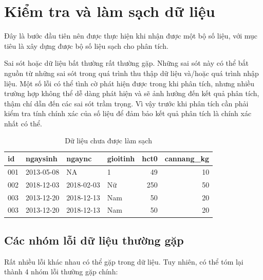 \documentclass[]{tufte-book}
\begin{document}
\hypertarget{data_cleaning}{%
\chapter{Kiểm tra và làm sạch dữ liệu}\label{data_cleaning}}

Đây là bước đầu tiên nên được thực hiện khi nhận được một bộ số liệu, với mục tiêu là xây dựng được bộ số liệu sạch cho phân tích.

Sai sót hoặc dữ liệu bất thường rất thường gặp. Những sai sót này có thể bắt nguồn từ những sai sót trong quá trình thu thập dữ liệu và/hoặc quá trình nhập liệu. Một số lỗi có thể tình cờ phát hiện được trong khi phân tích, nhưng nhiều trường hợp không thể dễ dàng phát hiện và sẽ ảnh hưởng đến kết quả phân tích, thậm chí dẫn đến các sai sót trầm trọng. Vì vậy trước khi phân tích cần phải kiểm tra tính chính xác của số liệu để đảm bảo kết quả phân tích là chính xác nhất có thể.

\begin{table}[t]

\caption{\label{tab:UncleanedDataset}Dữ liệu chưa được làm sạch}
\centering
\begin{tabular}{llllrr}
\toprule
id & ngaysinh & ngaync & gioitinh & hct0 & cannang\_kg\\
\midrule
001 & 2013-05-08 & NA & 1 & 49 & 10\\
002 & 2018-12-03 & 2018-02-03 & Nữ & 250 & 50\\
003 & 2013-12-20 & 2018-12-13 & Nam & 50 & 20\\
003 & 2013-12-20 & 2018-12-13 & Nam & 50 & 20\\
\bottomrule
\end{tabular}
\end{table}

\hypertarget{error}{%
\section{Các nhóm lỗi dữ liệu thường gặp}\label{error}}

Rất nhiều lỗi khác nhau có thể gặp trong dữ liệu. Tuy nhiên, có thể tóm lại thành 4 nhóm lỗi thường gặp chính:
\end{document}
